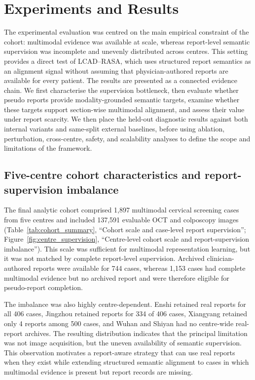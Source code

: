 \section{Experiments and Results}
\label{sec:experiments_results}

The experimental evaluation was centred on the main empirical constraint of the cohort: multimodal evidence was available at scale, whereas report-level semantic supervision was incomplete and unevenly distributed across centres. This setting provides a direct test of LCAD--RASA, which uses structured report semantics as an alignment signal without assuming that physician-authored reports are available for every patient. The results are presented as a connected evidence chain. We first characterise the supervision bottleneck, then evaluate whether pseudo reports provide modality-grounded semantic targets, examine whether these targets support section-wise multimodal alignment, and assess their value under report scarcity. We then place the held-out diagnostic results against both internal variants and same-split external baselines, before using ablation, perturbation, cross-centre, safety, and scalability analyses to define the scope and limitations of the framework.

\subsection{Five-centre cohort characteristics and report-supervision imbalance}
\label{subsec:cohort_results}

The final analytic cohort comprised 1,897 multimodal cervical screening cases from five centres and included 137,591 evaluable OCT and colposcopy images (Table~\ref{tab:cohort_summary}, ``Cohort scale and case-level report supervision''; Figure~\ref{fig:centre_supervision}, ``Centre-level cohort scale and report-supervision imbalance''). This scale was sufficient for multimodal representation learning, but it was not matched by complete report-level supervision. Archived clinician-authored reports were available for 744 cases, whereas 1,153 cases had complete multimodal evidence but no archived report and were therefore eligible for pseudo-report completion.

The imbalance was also highly centre-dependent. Enshi retained real reports for all 406 cases, Jingzhou retained reports for 334 of 406 cases, Xiangyang retained only 4 reports among 500 cases, and Wuhan and Shiyan had no centre-wide real-report archives. The resulting distribution indicates that the principal limitation was not image acquisition, but the uneven availability of semantic supervision. This observation motivates a report-aware strategy that can use real reports when they exist while extending structured semantic alignment to cases in which multimodal evidence is present but report records are missing.

